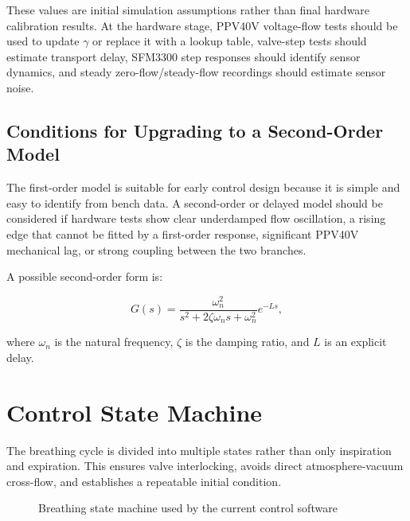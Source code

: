 \documentclass[11pt,a4paper]{article}
\begin{document}
These values are initial simulation assumptions rather than final hardware calibration results. At the hardware stage, PPV40V voltage-flow tests should be used to update $\gamma$ or replace it with a lookup table, valve-step tests should estimate transport delay, SFM3300 step responses should identify sensor dynamics, and steady zero-flow/steady-flow recordings should estimate sensor noise.

\subsection{Conditions for Upgrading to a Second-Order Model}

The first-order model is suitable for early control design because it is simple and easy to identify from bench data. A second-order or delayed model should be considered if hardware tests show clear underdamped flow oscillation, a rising edge that cannot be fitted by a first-order response, significant PPV40V mechanical lag, or strong coupling between the two branches.

A possible second-order form is:

\begin{equation}
  G(s)=\frac{\omega_n^2}{s^2+2\zeta\omega_n s+\omega_n^2}e^{-Ls},
\end{equation}

where $\omega_n$ is the natural frequency, $\zeta$ is the damping ratio, and $L$ is an explicit delay.

\section{Control State Machine}

The breathing cycle is divided into multiple states rather than only inspiration and expiration. This ensures valve interlocking, avoids direct atmosphere-vacuum cross-flow, and establishes a repeatable initial condition.

\begin{figure}[H]
\centering
{}
\caption{Breathing state machine used by the current control software}
\end{figure}
\end{document}

